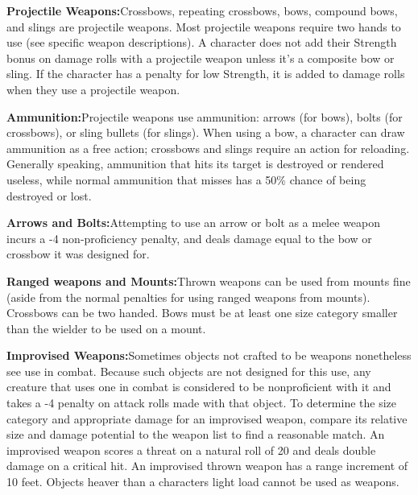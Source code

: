 {\noindent\textbf{Projectile Weapons:}{Crossbows, repeating crossbows, bows, compound bows, and slings are projectile weapons. Most projectile weapons require two hands to use (see specific weapon descriptions). A character does not add their Strength bonus on damage rolls with a projectile weapon unless it's a composite bow or sling. If the character has a penalty for low Strength, it is added to damage rolls when they use a projectile weapon.}

\noindent\textbf{Ammunition:}{Projectile weapons use ammunition: arrows (for bows), bolts (for crossbows), or sling bullets (for slings). When using a bow, a character can draw ammunition as a free action; crossbows and slings require an action for reloading. Generally speaking, ammunition that hits its target is destroyed or rendered useless, while normal ammunition that misses has a 50\% chance of being destroyed or lost.}

\noindent\textbf{Arrows and Bolts:}{Attempting to use an arrow or bolt as a melee weapon incurs a -4 non-proficiency penalty, and deals damage equal to the bow or crossbow it was designed for.}

\noindent\textbf{Ranged weapons and Mounts:}{Thrown weapons can be used from mounts fine (aside from the normal penalties for using ranged weapons from mounts). Crossbows can be two handed. Bows must be at least one size category smaller than the wielder to be used on a mount.}

\noindent\textbf{Improvised Weapons:}{Sometimes objects not crafted to be weapons nonetheless see use in combat. Because such objects are not designed for this use, any creature that uses one in combat is considered to be nonproficient with it and takes a -4 penalty on attack rolls made with that object. To determine the size category and appropriate damage for an improvised weapon, compare its relative size and damage potential to the weapon list to find a reasonable match. An improvised weapon scores a threat on a natural roll of 20 and deals double damage on a critical hit. An improvised thrown weapon has a range increment of 10 feet. Objects heaver than a characters light load cannot be used as weapons.}

}
